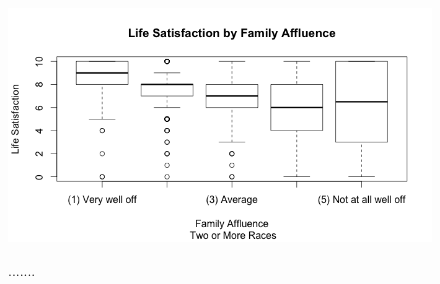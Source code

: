 \documentclass[12pt]{article}
\begin{document}
\begin{figure}[hptb]
	\centering
{\includegraphics[scale=0.45]{boxplotmoreraces.png}} \;
\caption{.......}
	\label{fig:img}
\end{figure}
\end{document}
